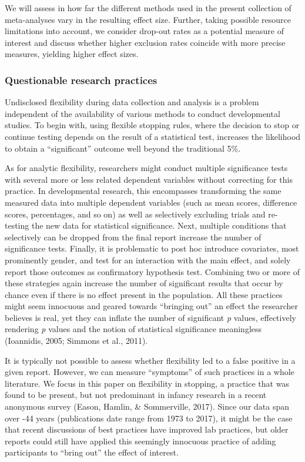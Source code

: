 \documentclass[english,floatsintext,man]{apa6}
\begin{document}
We will assess in how far the different methods used in the present
collection of meta-analyses vary in the resulting effect size. Further,
taking possible resource limitations into account, we consider drop-out
rates as a potential measure of interest and discuss whether higher
exclusion rates coincide with more precise measures, yielding higher
effect sizes.

\subsubsection{Questionable research
practices}\label{questionable-research-practices}

Undisclosed flexibility during data collection and analysis is a problem
independent of the availability of various methods to conduct
developmental studies. To begin with, using flexible stopping rules,
where the decision to stop or continue testing depends on the result of
a statistical test, increases the likelihood to obtain a
\enquote{significant} outcome well beyond the traditional 5\%.

As for analytic flexibility, researchers might conduct multiple
significance tests with several more or less related dependent variables
without correcting for this practice. In developmental research, this
encompasses transforming the same measured data into multiple dependent
variables (such as mean scores, difference scores, percentages, and so
on) as well as selectively excluding trials and re-testing the new data
for statistical significance. Next, multiple conditions that selectively
can be dropped from the final report increase the number of significance
tests. Finally, it is problematic to post hoc introduce covariates, most
prominently gender, and test for an interaction with the main effect,
and solely report those outcomes as confirmatory hypothesis test.
Combining two or more of these strategies again increase the number of
significant results that occur by chance even if there is no effect
present in the population. All these practices might seem innocuous and
geared towards \enquote{bringing out} an effect the researcher believes
is real, yet they can inflate the number of significant \emph{p} values,
effectively rendering \emph{p} values and the notion of statistical
significance meaningless (Ioannidis, 2005; Simmons et al., 2011).

It is typically not possible to assess whether flexibility led to a
false positive in a given report. However, we can measure
\enquote{symptoms} of such practices in a whole literature. We focus in
this paper on flexibility in stopping, a practice that was found to be
present, but not predominant in infancy research in a recent anonymous
survey (Eason, Hamlin, \& Sommerville, 2017). Since our data span over
-44 years (publications date range from 1973 to 2017), it might be the
case that recent discussions of best practices have improved lab
practices, but older reports could still have applied this seemingly
innocuous practice of adding participants to \enquote{bring out} the
effect of interest.
\end{document}
